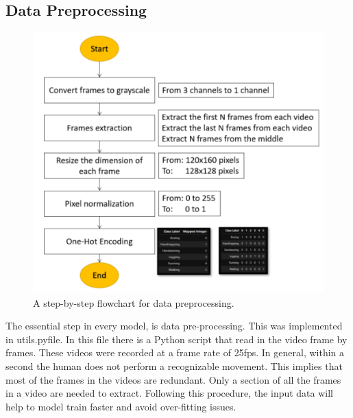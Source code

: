 \subsection{Data Preprocessing}
\begin{figure}[ht]
\centering
\includegraphics{Figures/dp}
\decoRule
\caption[A step-by-step flowchart for data preprocessing.]{A step-by-step flowchart for data preprocessing.}
\label{fig:la}
\end{figure}
The essential step in every model, is data pre-processing. This was implemented in utils.pyfile. In this file there is a Python script that read in the video frame by frames. These videos were recorded at a frame rate of 25fps. In general, within a second the human does not perform a recognizable movement. This implies that most of the frames in the videos are redundant. Only a section of all the frames in a video are needed to extract. Following this procedure, the input data will help to model train faster and avoid over-fitting issues.\\

